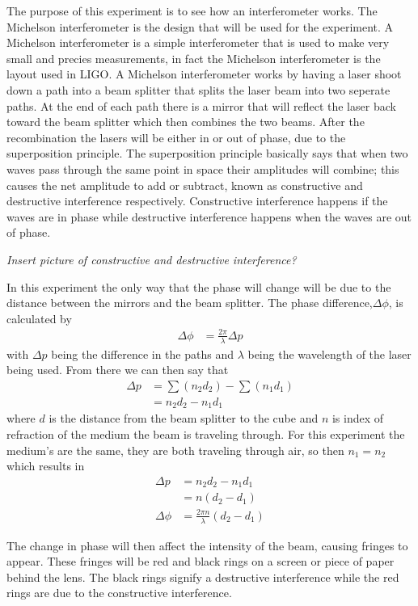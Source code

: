 	The purpose of this experiment is to see how an interferometer works. The Michelson interferometer is the design that 
will be used for the experiment. A Michelson interferometer is a simple interferometer that is used to make very small and precies
measurements, in fact the Michelson interferometer is the layout used in LIGO. A Michelson interferometer works by having a laser 
shoot down a path into a beam splitter that splits the laser beam into two seperate paths. At the end of each path there is a mirror
that will reflect the laser back toward the beam splitter which then combines the two beams. After the recombination the lasers 
will be either in or out of phase, due to the superposition principle. The superposition principle basically says that when two waves
pass through the same point in space their amplitudes will combine; this causes the net amplitude to add or subtract, known as
constructive and destructive interference respectively. Constructive interference happens if the waves are in phase while destructive 
interference happens when the waves are out of phase.

\emph{Insert picture of constructive and destructive interference?}

	In this experiment the only way that the phase will change will be due to the distance between the mirrors and the beam splitter.
The phase difference,$\Delta \phi$, is calculated by 
	\begin{align}
		\nonumber \Delta \phi &=\frac{2\pi}{\lambda} \Delta p
	\end{align}
with $\Delta p$ being the difference in the paths and $\lambda$ being the wavelength of the laser being used. From there we can then say that 
	\begin{align}
		\nonumber \Delta p &=\sum(n_2 d_2)-\sum(n_1 d_1) \\
		\nonumber		&=n_2 d_2 - n_1 d_1
	\end{align} 
where $d$ is the distance from the beam splitter to the cube and $n$ is index of refraction of the medium the beam is traveling 
through. For this experiment the medium's are the same, they are both traveling through air, so then $n_1=n_2$ which results in
	\begin{align}
		\nonumber \Delta p &= n_2 d_2 - n_1 d_1 \\
		\nonumber 	&= n(d_2 - d_1) \\
		\nonumber \Delta \phi &=\frac{2\pi n}{\lambda} (d_2 - d_1)
	\end{align}

	The change in phase will then affect the intensity of the beam, causing fringes to appear. These fringes will be red and black
rings on a screen or piece of paper behind the lens. The black rings signify a destructive interference while the red rings are 
due to the constructive interference. 
